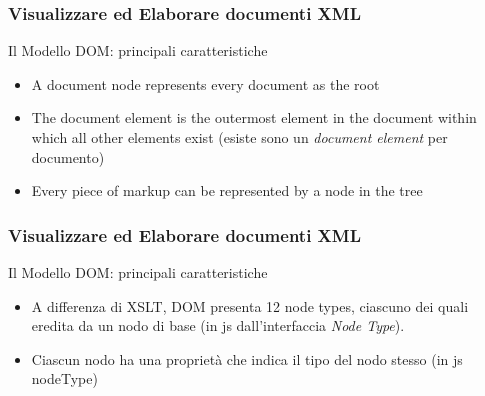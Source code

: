 \begin{frame}
    \frametitle{Visualizzare ed Elaborare documenti XML}
    \addtocounter{nframe}{1}
    

     \begin{block}{Il Modello DOM: principali caratteristiche}
        \begin{itemize}
            \item A document node represents every document as the root
            \item The document element is the outermost element in the document within which all other elements exist (esiste sono un \textit{document element} per documento)
            \item Every piece of markup can be represented by a node in the tree
        \end{itemize}
     \end{block}
     
\end{frame}

\begin{frame}
    \frametitle{Visualizzare ed Elaborare documenti XML}
    \addtocounter{nframe}{1}
    

     \begin{block}{Il Modello DOM: principali caratteristiche}
        \begin{itemize}
            \item A differenza di XSLT, DOM presenta 12 node types, ciascuno dei quali eredita da un nodo di base (in js dall'interfaccia \textit{Node Type}).
            \item Ciascun nodo ha una proprietà che indica il tipo del nodo stesso (in js nodeType)
        \end{itemize}
     \end{block}
     
\end{frame}

